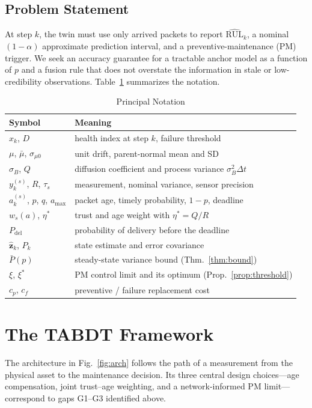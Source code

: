 \documentclass[journal]{IEEEtran}
\newcommand{\rul}{\mathrm{RUL}}
\newcommand{\Pb}{\bar{P}}
\begin{document}
\subsection{Problem Statement}
At step $k$, the twin must use only arrived packets to report
$\widehat{\rul}_k$, a nominal $(1-\alpha)$ approximate prediction interval,
and a preventive-maintenance (PM) trigger. We seek an accuracy guarantee for
a tractable anchor model as a function of $p$ and a fusion rule that does not
overstate the information in stale or low-credibility observations.
Table~\ref{tab:notation} summarizes the notation.

\begin{table}[!t]
\centering
\caption{Principal Notation}
\label{tab:notation}
\begin{tabular}{ll}
\toprule
Symbol & Meaning \\
\midrule
$x_k$, $D$ & health index at step $k$, failure threshold \\
$\mu$, $\bar\mu$, $\sigma_{\mu0}$ & unit drift, parent-normal mean and SD \\
$\sigma_B$, $Q$ & diffusion coefficient and process variance $\sigma_B^2\Delta t$ \\
$y_k^{(s)}$, $R$, $\tau_s$ & measurement, nominal variance, sensor precision \\
$a_k^{(s)}$, $p$, $q$, $a_{\max}$ & packet age, timely probability, $1-p$, deadline \\
$w_s(a)$, $\eta^{*}$ & trust and age weight with $\eta^{*}=Q/R$ \\
$P_{\mathrm{del}}$ & probability of delivery before the deadline \\
$\hat{\mathbf z}_k$, $P_k$ & state estimate and error covariance \\
$\Pb(p)$ & steady-state variance bound (Thm.~\ref{thm:bound}) \\
$\xi$, $\xi^{*}$ & PM control limit and its optimum (Prop.~\ref{prop:threshold}) \\
$c_p$, $c_f$ & preventive / failure replacement cost \\
\bottomrule
\end{tabular}
\end{table}

\section{The TABDT Framework}\label{sec:framework}

The architecture in Fig.~\ref{fig:arch} follows the path of a measurement
from the physical asset to the maintenance decision. Its three central design
choices---age compensation, joint trust--age weighting, and a
network-informed PM limit---correspond to gaps G1--G3 identified above.
\end{document}
